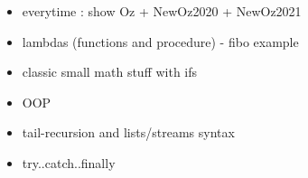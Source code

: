 \begin{itemize}
    \item everytime : show Oz + NewOz2020 + NewOz2021
    \item lambdas (functions and procedure) - fibo example
    \item classic small math stuff with ifs
    \item OOP
    \item tail-recursion and lists/streams syntax
    \item try..catch..finally
\end{itemize}

